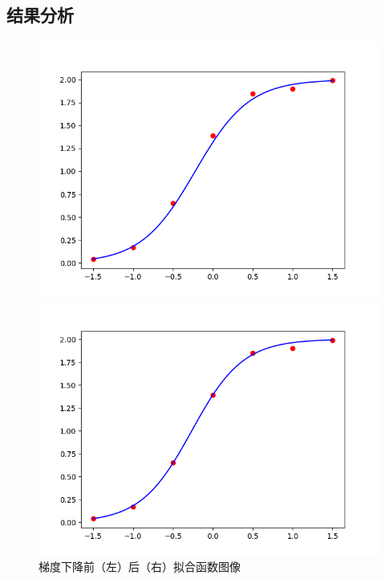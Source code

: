 \documentclass[UTF8,ctexart,a4paper,11pt,openany]{article}
\theoremstyle{definition}
\begin{document}
    \subsection{结果分析}
        \begin{figure}[H]
            \begin{minipage}{0.5\textwidth}
                \centering
                \includegraphics[width=\linewidth]{pics/P7.5.png}
            \end{minipage}%
            \begin{minipage}{0.5\textwidth}
                \centering
                \includegraphics[width=\linewidth]{pics/P7.6.png}
            \end{minipage}
        \caption{梯度下降前（左）后（右）拟合函数图像}
        \end{figure}
\end{document}
